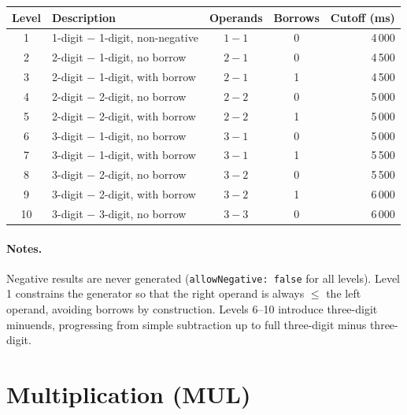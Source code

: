 \documentclass[11pt]{article}
\begin{document}
\begin{longtable}{@{}clccr@{}}
\toprule
\textbf{Level} & \textbf{Description} & \textbf{Operands} & \textbf{Borrows} & \textbf{Cutoff (ms)} \\
\midrule
\endhead
1  & 1-digit $-$ 1-digit, non-negative          & $1 - 1$ & 0 & 4\,000 \\
2  & 2-digit $-$ 1-digit, no borrow             & $2 - 1$ & 0 & 4\,500 \\
3  & 2-digit $-$ 1-digit, with borrow           & $2 - 1$ & 1 & 4\,500 \\
4  & 2-digit $-$ 2-digit, no borrow             & $2 - 2$ & 0 & 5\,000 \\
5  & 2-digit $-$ 2-digit, with borrow           & $2 - 2$ & 1 & 5\,000 \\
6  & 3-digit $-$ 1-digit, no borrow             & $3 - 1$ & 0 & 5\,000 \\
7  & 3-digit $-$ 1-digit, with borrow           & $3 - 1$ & 1 & 5\,500 \\
8  & 3-digit $-$ 2-digit, no borrow             & $3 - 2$ & 0 & 5\,500 \\
9  & 3-digit $-$ 2-digit, with borrow           & $3 - 2$ & 1 & 6\,000 \\
10 & 3-digit $-$ 3-digit, no borrow             & $3 - 3$ & 0 & 6\,000 \\
\bottomrule
\end{longtable}

\paragraph{Notes.}
Negative results are never generated (\texttt{allowNegative: false} for all levels).
Level 1 constrains the generator so that the right operand is always $\leq$ the left operand,
avoiding borrows by construction.  Levels 6–10 introduce three-digit minuends, progressing
from simple subtraction up to full three-digit minus three-digit.

\section{Multiplication (MUL)}
\end{document}
